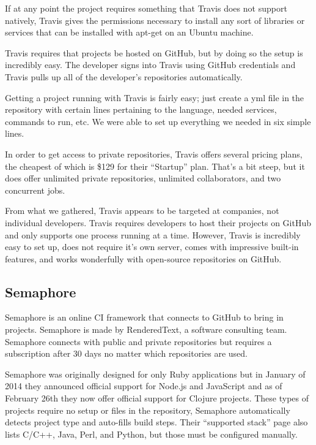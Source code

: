 \documentclass[12pt]{ucthesis}
\begin{document}
If at any point the project requires something that Travis does not support natively, Travis gives the permissions necessary to install any sort of libraries or services that can be installed with apt-get on an Ubuntu machine.

Travis requires that projects be hosted on GitHub, but by doing so the setup is incredibly easy. The developer signs into Travis using GitHub credentials and Travis pulls up all of the developer's repositories automatically. 

Getting a project running with Travis is fairly easy; just create a yml file in the repository with certain lines pertaining to the language, needed services, commands to run, etc. We were able to set up everything we needed in six simple lines.

In order to get access to private repositories, Travis offers several pricing plans, the cheapest of which is \$129 \cite{TravisPricing} for their ``Startup'' plan. That's a bit steep, but it does offer unlimited private repositories, unlimited collaborators, and two concurrent jobs. 

From what we gathered, Travis appears to be targeted at companies, not individual developers. Travis requires developers to host their projects on GitHub and only supports one process running at a time. However, Travis is incredibly easy to set up, does not require it's own server, comes with impressive built-in features, and works wonderfully with open-source repositories on GitHub.

\subsection{Semaphore}
Semaphore\cite{Semaphore} is an online CI framework that connects to GitHub to bring in projects. Semaphore is made by RenderedText, a software consulting team. Semaphore connects with public and private repositories but requires a subscription after 30 days no matter which repositories are used.

Semaphore was originally designed for only Ruby applications but in January of 2014 they announced official support for Node.js and JavaScript and as of February 26th they now offer official support for Clojure projects.\cite{SemaphoreBlog} These types of projects require no setup or files in the repository, Semaphore automatically detects project type and auto-fills build steps. Their ``supported stack'' page also lists C/C++, Java, Perl, and Python, but those must be configured manually. 
\end{document}
